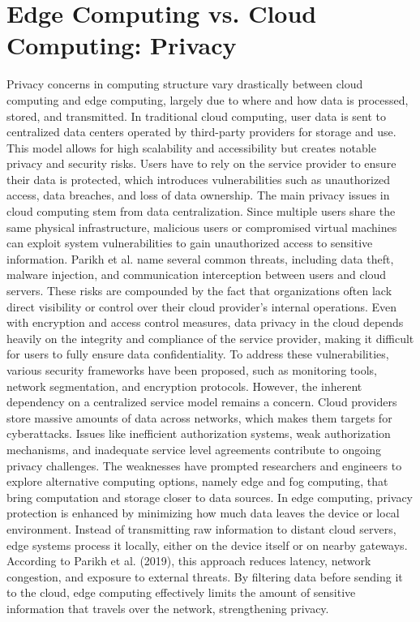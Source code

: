 \documentclass[conference]{IEEEtran}
\begin{document}
\section{Edge Computing vs. Cloud Computing: Privacy}
Privacy concerns in computing structure vary drastically between cloud computing and edge computing, largely due to where and how data is processed, stored, and transmitted. In traditional cloud computing, user data is sent to centralized data centers operated by third-party providers for storage and use. This model allows for high scalability and accessibility but creates notable privacy and security risks. Users have to rely on the service provider to ensure their data is protected, which introduces vulnerabilities such as unauthorized access, data breaches, and loss of data ownership. 
The main privacy issues in cloud computing stem from data centralization. Since multiple users share the same physical infrastructure, malicious users or compromised virtual machines can exploit system vulnerabilities to gain unauthorized access to sensitive information. Parikh et al. name several common threats, including data theft, malware injection, and communication interception between users and cloud servers. These risks are compounded by the fact that organizations often lack direct visibility or control over their cloud provider’s internal operations. Even with encryption and access control measures, data privacy in the cloud depends heavily on the integrity and compliance of the service provider, making it difficult for users to fully ensure data confidentiality.
To address these vulnerabilities, various security frameworks have been proposed, such as monitoring tools, network segmentation, and encryption protocols. However, the inherent dependency on a centralized service model remains a concern. Cloud providers store massive amounts of data across networks, which makes them targets for cyberattacks. Issues like inefficient authorization systems, weak authorization mechanisms, and inadequate service level agreements contribute to ongoing privacy challenges. The weaknesses have prompted researchers and engineers to explore alternative computing options, namely edge and fog computing, that bring computation and storage closer to data sources.
In edge computing, privacy protection is enhanced by minimizing how much data leaves the device or local environment. Instead of transmitting raw information to distant cloud servers, edge systems process it locally, either on the device itself or on nearby gateways. According to Parikh et al. (2019), this approach reduces latency, network congestion, and exposure to external threats. By filtering data before sending it to the cloud, edge computing effectively limits the amount of sensitive information that travels over the network, strengthening privacy. 
\end{document}
